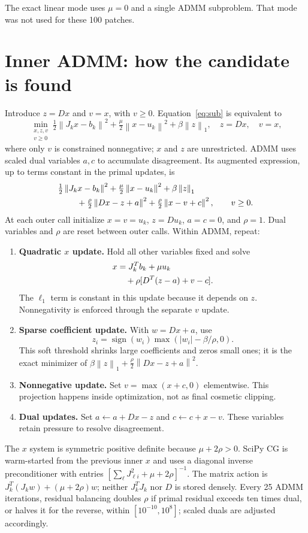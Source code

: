 \documentclass[11pt,a4paper]{article}
\newcommand{\norm}[1]{\left\lVert#1\right\rVert}
\begin{document}
The exact linear mode uses $\mu=0$ and a single ADMM subproblem. That mode was not used for these 100 patches.
\clearpage
\section{Inner ADMM: how the candidate is found}
Introduce $z=Dx$ and $v=x$, with $v\ge0$. Equation~\eqref{eq:sub} is equivalent to
\[
 \min_{\substack{x,z,v\\v\ge0}}\tfrac12\norm{J_kx-b_k}^2+
 \tfrac\mu2\norm{x-u_k}^2+\beta\norm z_1,
 \quad z=Dx,\quad v=x,
\]
where only $v$ is constrained nonnegative; $x$ and $z$ are unrestricted. ADMM uses scaled dual variables $a,c$ to accumulate disagreement. Its augmented expression, up to terms constant in the primal updates, is
\begin{align*}
 &\tfrac12\norm{J_kx-b_k}^2+\tfrac\mu2\norm{x-u_k}^2+\beta\norm z_1\notag\\
 &\hspace{8mm}+\tfrac\rho2\norm{Dx-z+a}^2+\tfrac\rho2\norm{x-v+c}^2,
 \qquad v\ge0.
\end{align*}
At each outer call initialize $x=v=u_k$, $z=Du_k$, $a=c=0$, and $\rho=1$. Dual variables and $\rho$ are reset between outer calls. Within ADMM, repeat:
\begin{enumerate}
\item \textbf{Quadratic $x$ update.} Hold all other variables fixed and solve
\begin{align}
 [J_k^TJ_k+(\mu+2\rho)I]x
 &=J_k^Tb_k+\mu u_k\notag\\
 &\quad+\rho[D^T(z-a)+v-c].\label{eq:cg}
\end{align}
The $\ell_1$ term is constant in this update because it depends on $z$. Nonnegativity is enforced through the separate $v$ update.
\item \textbf{Sparse coefficient update.} With $w=Dx+a$, use
\[
 z_i=\operatorname{sign}(w_i)\max(|w_i|-\beta/\rho,0).
\]
This soft threshold shrinks large coefficients and zeros small ones; it is the exact minimizer of $\beta\norm z_1+\frac\rho2\norm{Dx-z+a}^2$.
\item \textbf{Nonnegative update.} Set $v=\max(x+c,0)$ elementwise. This projection happens inside optimization, not as final cosmetic clipping.
\item \textbf{Dual updates.} Set $a\leftarrow a+Dx-z$ and $c\leftarrow c+x-v$. These variables retain pressure to resolve disagreement.
\end{enumerate}
The $x$ system is symmetric positive definite because $\mu+2\rho>0$. SciPy CG is warm-started from the previous inner $x$ and uses a diagonal inverse preconditioner with entries $[\sum_\ell J_{\ell i}^2+\mu+2\rho]^{-1}$. The matrix action is $J_k^T(J_kw)+(\mu+2\rho)w$; neither $J_k^TJ_k$ nor $D$ is stored densely. Every 25 ADMM iterations, residual balancing doubles $\rho$ if primal residual exceeds ten times dual, or halves it for the reverse, within $[10^{-10},10^8]$; scaled duals are adjusted accordingly.
\clearpage
\end{document}
